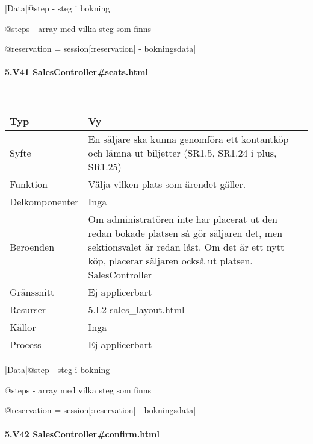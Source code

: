 \documentclass[a4paper, twoside, 11pt, titlepage]{article}
\begin{document}
			|Data|@step - steg i bokning

			@steps - array med vilka steg som finns

			@reservation = session[:reservation] - bokningsdata|

			\paragraph{5.V41 SalesController\#seats.html}\

			\begin {table} [ht] \begin{tabular} {  p{3.5cm} p{9.6cm} }
				\hline
				Typ & Vy  \\
				\hline
				Syfte & En säljare ska kunna genomföra ett kontantköp och lämna ut biljetter (SR1.5, SR1.24 i plus, SR1.25)  \\
				\hline
				Funktion & Välja vilken plats som ärendet gäller.  \\
				\hline
				Delkomponenter & Inga  \\
				\hline
				Beroenden & Om administratören inte har placerat ut den redan bokade platsen så gör säljaren det, men sektionsvalet är redan låst. Om det är ett nytt köp, placerar säljaren också ut platsen. SalesController  \\
				\hline
				Gränssnitt & Ej applicerbart  \\
				\hline
				Resurser & 5.L2 sales\_layout.html  \\
				\hline
				Källor & Inga  \\
				\hline
				Process & Ej applicerbart  \\
				\hline
			\end{tabular} \end{table} \FloatBarrier
			\vspace{6mm}

			|Data|@step - steg i bokning

			@steps - array med vilka steg som finns

			@reservation = session[:reservation] - bokningsdata|

			\paragraph{5.V42 SalesController\#confirm.html}\
\end{document}
